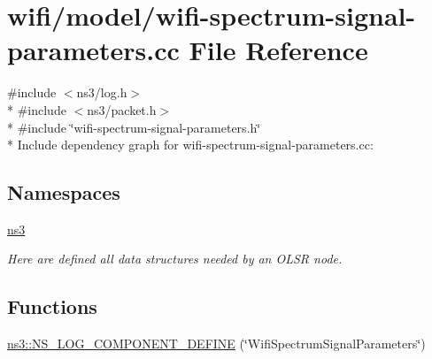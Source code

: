 \hypertarget{wifi-spectrum-signal-parameters_8cc}{}\section{wifi/model/wifi-\/spectrum-\/signal-\/parameters.cc File Reference}
\label{wifi-spectrum-signal-parameters_8cc}
{\ttfamily \#include $<$ns3/log.\+h$>$}\\*
{\ttfamily \#include $<$ns3/packet.\+h$>$}\\*
{\ttfamily \#include \char`\"{}wifi-\/spectrum-\/signal-\/parameters.\+h\char`\"{}}\\*
Include dependency graph for wifi-\/spectrum-\/signal-\/parameters.cc\+:
\subsection*{Namespaces}
\begin{DoxyCompactItemize}
\item 
 \hyperlink{namespacens3}{ns3}
\begin{DoxyCompactList}\small\item\em Here are defined all data structures needed by an O\+L\+SR node. \end{DoxyCompactList}\end{DoxyCompactItemize}
\subsection*{Functions}
\begin{DoxyCompactItemize}
\item 
\hyperlink{namespacens3_a8de8148393337a170885206ec0ff6472}{ns3\+::\+N\+S\+\_\+\+L\+O\+G\+\_\+\+C\+O\+M\+P\+O\+N\+E\+N\+T\+\_\+\+D\+E\+F\+I\+NE} (\char`\"{}Wifi\+Spectrum\+Signal\+Parameters\char`\"{})
\end{DoxyCompactItemize}
